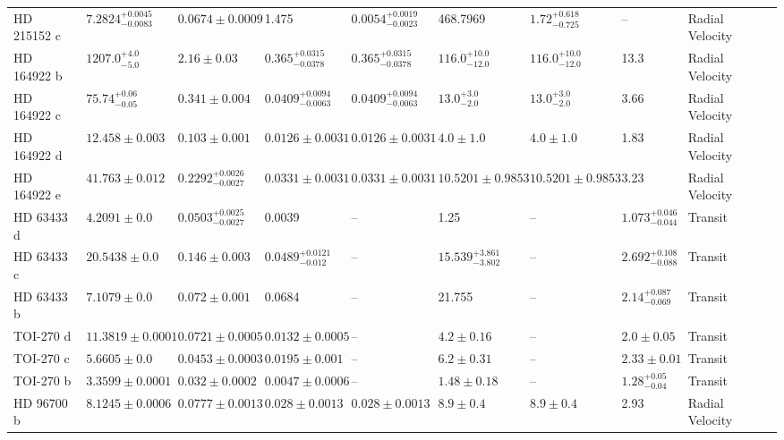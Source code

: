 \begin{tabular}{llllllllll}
HD 215152 c & $7.2824^{+0.0045}_{-0.0083}$ & $0.0674 \pm 0.0009$ & 1.475 & $0.0054^{+0.0019}_{-0.0023}$ & 468.7969 & $1.72^{+0.618}_{-0.725}$ & -- & Radial Velocity & \cite{DELISLE_ET_AL__2018} \\
HD 164922 b & $1207.0^{+4.0}_{-5.0}$ & $2.16 \pm 0.03$ & $0.365^{+0.0315}_{-0.0378}$ & $0.365^{+0.0315}_{-0.0378}$ & $116.0^{+10.0}_{-12.0}$ & $116.0^{+10.0}_{-12.0}$ & 13.3 & Radial Velocity & \cite{BENATTI_ET_AL__2020} \\
HD 164922 c & $75.74^{+0.06}_{-0.05}$ & $0.341 \pm 0.004$ & $0.0409^{+0.0094}_{-0.0063}$ & $0.0409^{+0.0094}_{-0.0063}$ & $13.0^{+3.0}_{-2.0}$ & $13.0^{+3.0}_{-2.0}$ & 3.66 & Radial Velocity & \cite{BENATTI_ET_AL__2020} \\
HD 164922 d & $12.458 \pm 0.003$ & $0.103 \pm 0.001$ & $0.0126 \pm 0.0031$ & $0.0126 \pm 0.0031$ & $4.0 \pm 1.0$ & $4.0 \pm 1.0$ & 1.83 & Radial Velocity & \cite{BENATTI_ET_AL__2020} \\
HD 164922 e & $41.763 \pm 0.012$ & $0.2292^{+0.0026}_{-0.0027}$ & $0.0331 \pm 0.0031$ & $0.0331 \pm 0.0031$ & $10.5201 \pm 0.9853$ & $10.5201 \pm 0.9853$ & 3.23 & Radial Velocity & \cite{ROSENTHAL_ET_AL__2021} \\
HD 63433 d & $4.2091 \pm 0.0$ & $0.0503^{+0.0025}_{-0.0027}$ & 0.0039 & -- & 1.25 & -- & $1.073^{+0.046}_{-0.044}$ & Transit & \cite{CAPISTRANT_ET_AL_2024} \\
HD 63433 c & $20.5438 \pm 0.0$ & $0.146 \pm 0.003$ & $0.0489^{+0.0121}_{-0.012}$ & -- & $15.539^{+3.861}_{-3.802}$ & -- & $2.692^{+0.108}_{-0.088}$ & Transit & \cite{MALLORQU_AMP_IACUTE_N_ET_AL__2023} \\
HD 63433 b & $7.1079 \pm 0.0$ & $0.072 \pm 0.001$ & 0.0684 & -- & 21.755 & -- & $2.14^{+0.087}_{-0.069}$ & Transit & \cite{MALLORQU_AMP_IACUTE_N_ET_AL__2023} \\
TOI-270 d & $11.3819 \pm 0.0001$ & $0.0721 \pm 0.0005$ & $0.0132 \pm 0.0005$ & -- & $4.2 \pm 0.16$ & -- & $2.0 \pm 0.05$ & Transit & \cite{KAYE_ET_AL__2022} \\
TOI-270 c & $5.6605 \pm 0.0$ & $0.0453 \pm 0.0003$ & $0.0195 \pm 0.001$ & -- & $6.2 \pm 0.31$ & -- & $2.33 \pm 0.01$ & Transit & \cite{KAYE_ET_AL__2022} \\
TOI-270 b & $3.3599 \pm 0.0001$ & $0.032 \pm 0.0002$ & $0.0047 \pm 0.0006$ & -- & $1.48 \pm 0.18$ & -- & $1.28^{+0.05}_{-0.04}$ & Transit & \cite{KAYE_ET_AL__2022} \\
HD 96700 b & $8.1245 \pm 0.0006$ & $0.0777 \pm 0.0013$ & $0.028 \pm 0.0013$ & $0.028 \pm 0.0013$ & $8.9 \pm 0.4$ & $8.9 \pm 0.4$ & 2.93 & Radial Velocity & \cite{UNGER_ET_AL__2021} \\

\end{tabular}
